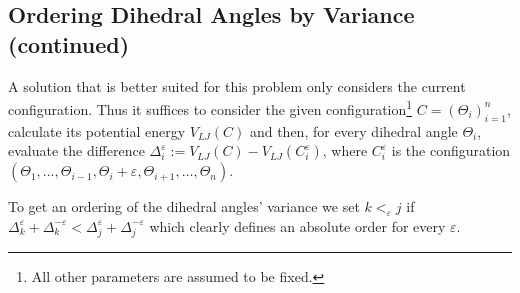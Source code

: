 \subsection{Ordering Dihedral Angles by Variance (continued)}
A solution that is better suited for this problem only considers the current configuration.
Thus it suffices to consider the given configuration\footnote{All other parameters are assumed to be fixed.} $C=(\Theta_i)_{i=1}^n$, calculate its potential energy $V_{LJ}(C)$ and then, for every dihedral angle $\Theta_i$, evaluate the difference $\Delta_i^\varepsilon := V_{LJ}(C) - V_{LJ}(C_i^\varepsilon)$, where $C_i^\varepsilon$ is the configuration $(\Theta_1,\dots,\Theta_{i-1},\Theta_i + \varepsilon,\Theta_{i+1},\dots,\Theta_n)$.

To get an ordering of the dihedral angles' variance we set $k<_\varepsilon j$ if $\Delta_k^\varepsilon + \Delta_k^{-\varepsilon} < \Delta_j^\varepsilon + \Delta_j^{-\varepsilon}$ which clearly defines an absolute order for every $\varepsilon$.
